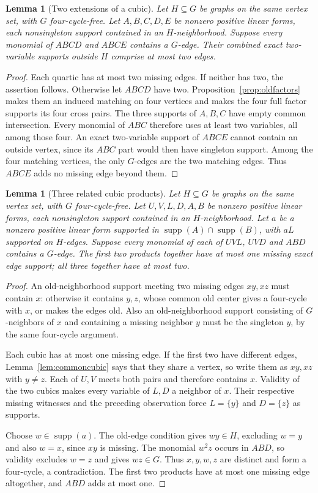 \documentclass[11pt]{article}
\newcommand{\supp}{\operatorname{supp}}
\newtheorem{lemma}[theorem]{Lemma}
\theoremstyle{definition}
\theoremstyle{remark}
\begin{document}
\begin{lemma}[Two extensions of a cubic]\label{lem:sharedquartics}
Let $H\subseteq G$ be graphs on the same vertex set, with $G$ four-cycle-free. Let $A,B,C,D,E$ be nonzero positive linear forms, each nonsingleton support contained in an $H$-neighborhood. Suppose every monomial of $ABCD$ and $ABCE$ contains a $G$-edge. Their combined exact two-variable supports outside $H$ comprise at most two edges.
\end{lemma}
\begin{proof}
Each quartic has at most two missing edges. If neither has two, the assertion follows. Otherwise let $ABCD$ have two. Proposition~\ref{prop:oldfactors} makes them an induced matching on four vertices and makes the four full factor supports its four cross pairs. The three supports of $A,B,C$ have empty common intersection. Every monomial of $ABC$ therefore uses at least two variables, all among those four. An exact two-variable support of $ABCE$ cannot contain an outside vertex, since its $ABC$ part would then have singleton support. Among the four matching vertices, the only $G$-edges are the two matching edges. Thus $ABCE$ adds no missing edge beyond them.
\end{proof}

\begin{lemma}[Three related cubic products]\label{lem:relatedcubics}
Let $H\subseteq G$ be graphs on the same vertex set, with $G$ four-cycle-free. Let $U,V,L,D,A,B$ be nonzero positive linear forms, each nonsingleton support contained in an $H$-neighborhood. Let $a$ be a nonzero positive linear form supported in $\supp(A)\cap\supp(B)$, with $aL$ supported on $H$-edges. Suppose every monomial of each of $UVL$, $UVD$ and $ABD$ contains a $G$-edge. The first two products together have at most one missing exact edge support; all three together have at most two.
\end{lemma}
\begin{proof}
An old-neighborhood support meeting two missing edges $xy,xz$ must contain $x$: otherwise it contains $y,z$, whose common old center gives a four-cycle with $x$, or makes the edges old. Also an old-neighborhood support consisting of $G$-neighbors of $x$ and containing a missing neighbor $y$ must be the singleton $y$, by the same four-cycle argument.

Each cubic has at most one missing edge. If the first two have different edges, Lemma~\ref{lem:commoncubic} says that they share a vertex, so write them as $xy,xz$ with $y\ne z$. Each of $U,V$ meets both pairs and therefore contains $x$. Validity of the two cubics makes every variable of $L,D$ a neighbor of $x$. Their respective missing witnesses and the preceding observation force $L=\{y\}$ and $D=\{z\}$ as supports.

Choose $w\in\supp(a)$. The old-edge condition gives $wy\in H$, excluding $w=y$ and also $w=x$, since $xy$ is missing. The monomial $w^2z$ occurs in $ABD$, so validity excludes $w=z$ and gives $wz\in G$. Thus $x,y,w,z$ are distinct and form a four-cycle, a contradiction. The first two products have at most one missing edge altogether, and $ABD$ adds at most one.
\end{proof}
\end{document}
